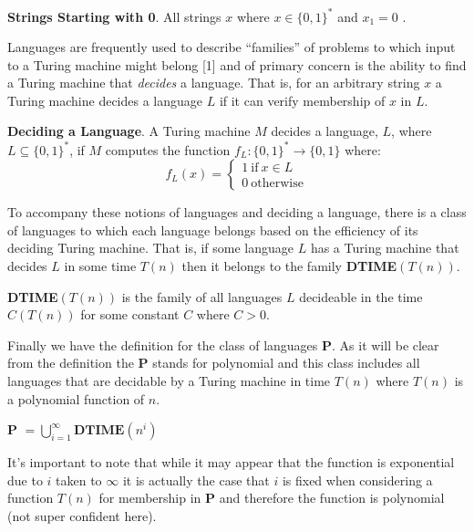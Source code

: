 \documentclass[usletter]{article}
\begin{document}
\begin{example}
  \textbf{Strings Starting with 0}. All strings $x$ where $x \in \{0, 1\}^*$ and $x_1 = 0$ .
\end{example}

Languages are frequently used to describe ``families'' of problems to which input to a Turing machine might belong [1] and of primary concern is the ability to find a Turing machine that \textit{decides} a language. That is, for an arbitrary string $x$ a Turing machine decides a language $L$ if it can verify membership of $x$ in $L$.

\begin{definition}
  \textbf{Deciding a Language}. A Turing machine $M$ decides a language, $L$,  where $ L \subseteq \{0,1\}^*$, if $M$ computes the function $f_L : \{0, 1\}^* \rightarrow \{0,1\}$ where:
  \begin{equation}
    f_L(x) =
    \begin{cases}
      1\ \text{if}\ x \in L \\
      0\ \text{otherwise}
    \end{cases}
  \end{equation}
\end{definition}

To accompany these notions of languages and deciding a language, there is a class of languages to which each language belongs based on the efficiency of its deciding Turing machine. That is, if some language $L$ has a Turing machine that decides $L$ in some time $T(n)$ then it belongs to the family \textbf{DTIME}$(T(n))$.

\begin{definition}
  \textbf{DTIME}$(T(n))$ is the family of all languages $L$ decideable in the time $C(T(n))$ for some constant $C$ where $C > 0$.
\end{definition}

Finally we have the definition for the class of languages \textbf{P}. As it will be clear from the definition the \textbf{P} stands for polynomial and this class includes all languages that are decidable by a Turing machine in time $T(n)$ where $T(n)$ is a polynomial function of $n$.

\begin{definition}
  \textbf{P} $= \bigcup\limits_{i=1}^{\infty} \textbf{DTIME}(n^i)$
\end{definition}

It's important to note that while it may appear that the function is exponential due to $i$ taken to $\infty$ it is actually the case that $i$ is fixed when considering a function $T(n)$ for membership in \textbf{P} and therefore the function is polynomial (not super confident here).
\end{document}
